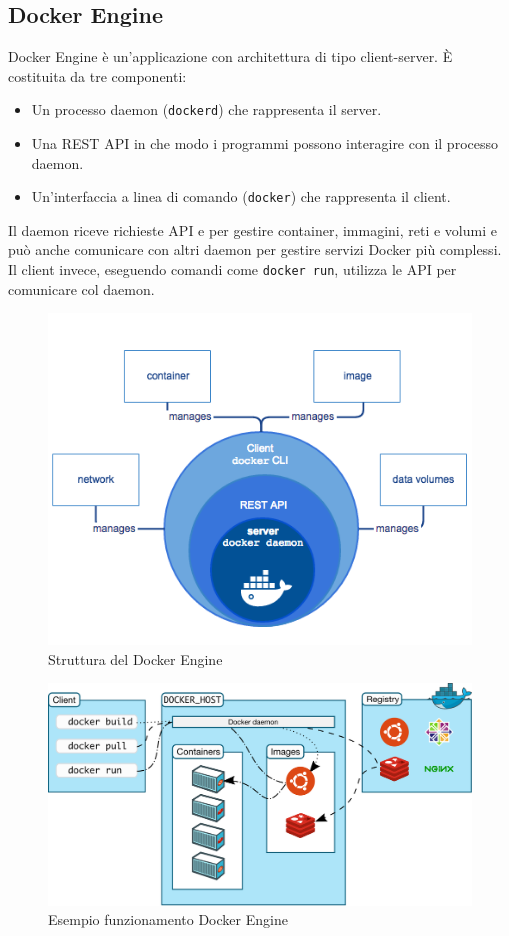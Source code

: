 \subsection{Docker Engine}
Docker Engine è un'applicazione con architettura di tipo client-server. È costituita da tre componenti:
\begin{itemize}
    \item Un processo daemon (\verb|dockerd|) che rappresenta il server.
    \item Una REST API in che modo i programmi possono interagire con il processo daemon.
    \item Un'interfaccia a linea di comando (\verb|docker|) che rappresenta il client.
\end{itemize}
Il daemon riceve richieste API e per gestire container, immagini, reti e volumi e può anche comunicare con altri daemon per gestire servizi Docker più complessi. Il client invece, eseguendo comandi come \verb|docker run|, utilizza le API per comunicare col daemon.

\begin{figure}[ht]
    \centering
    \includegraphics[scale=0.5]{immagini/engine-components-flow.png}
    \caption{Struttura del Docker Engine}
    \label{fig:docker-engine}
\end{figure}

\begin{figure}[ht]
    \centering
    \includegraphics[scale=0.3]{immagini/architecture.png}
    \caption{Esempio funzionamento Docker Engine}
    \label{fig:docker-architecture}
\end{figure}

